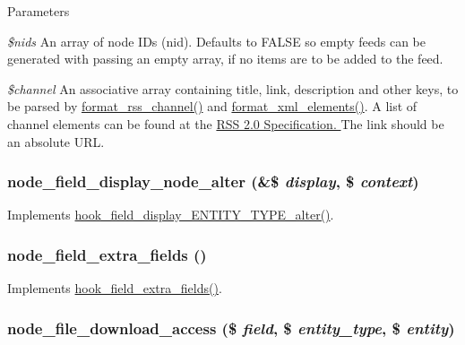 \begin{DoxyParams}{Parameters}
\item[{\em \$nids}]An array of node IDs (nid). Defaults to FALSE so empty feeds can be generated with passing an empty array, if no items are to be added to the feed. \item[{\em \$channel}]An associative array containing title, link, description and other keys, to be parsed by \hyperlink{group__format_ga44992b971aed4a6a5b8457678f57de50}{format\_\-rss\_\-channel()} and \hyperlink{group__format_gafb344c648e6b63c35950d2889430e4c7}{format\_\-xml\_\-elements()}. A list of channel elements can be found at the \hyperlink{}{RSS 2.0 Specification. } The link should be an absolute URL. \end{DoxyParams}
\hypertarget{node_8module_af7264f779bfc22a3d1373bda83ccaea8}{
\subsubsection[{node\_\-field\_\-display\_\-node\_\-alter}]{\setlength{\rightskip}{0pt plus 5cm}node\_\-field\_\-display\_\-node\_\-alter (\&\$ {\em display}, \/  \$ {\em context})}}
\label{node_8module_af7264f779bfc22a3d1373bda83ccaea8}
Implements \hyperlink{group__field__storage_gadc76e94183dbbeebe237c70be5ca1e96}{hook\_\-field\_\-display\_\-ENTITY\_\-TYPE\_\-alter()}. \hypertarget{node_8module_aeeec04be4558239e02b0b25151c7bf7d}{
\subsubsection[{node\_\-field\_\-extra\_\-fields}]{\setlength{\rightskip}{0pt plus 5cm}node\_\-field\_\-extra\_\-fields ()}}
\label{node_8module_aeeec04be4558239e02b0b25151c7bf7d}
Implements \hyperlink{group__hooks_ga7100332aa5b4d5f6ba72534599d133e5}{hook\_\-field\_\-extra\_\-fields()}. \hypertarget{node_8module_adba6b7e58eca64bcca36f8cc40597f45}{
\subsubsection[{node\_\-file\_\-download\_\-access}]{\setlength{\rightskip}{0pt plus 5cm}node\_\-file\_\-download\_\-access (\$ {\em field}, \/  \$ {\em entity\_\-type}, \/  \$ {\em entity})}}
